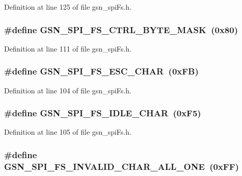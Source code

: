 Definition at line 125 of file gsn\_\-spiFs.h.

\hypertarget{a00589_a3204c4dc871b1ad1a9ef9824ffc6363a}{
\subsubsection[{GSN\_\-SPI\_\-FS\_\-CTRL\_\-BYTE\_\-MASK}]{\setlength{\rightskip}{0pt plus 5cm}\#define GSN\_\-SPI\_\-FS\_\-CTRL\_\-BYTE\_\-MASK~(0x80)}}
\label{a00589_a3204c4dc871b1ad1a9ef9824ffc6363a}


Definition at line 111 of file gsn\_\-spiFs.h.

\hypertarget{a00589_a7e094b6ce520816d1515bb857773d6d8}{
\subsubsection[{GSN\_\-SPI\_\-FS\_\-ESC\_\-CHAR}]{\setlength{\rightskip}{0pt plus 5cm}\#define GSN\_\-SPI\_\-FS\_\-ESC\_\-CHAR~(0xFB)}}
\label{a00589_a7e094b6ce520816d1515bb857773d6d8}


Definition at line 104 of file gsn\_\-spiFs.h.

\hypertarget{a00589_acd339376b057e3f2e518c3985f6b4556}{
\subsubsection[{GSN\_\-SPI\_\-FS\_\-IDLE\_\-CHAR}]{\setlength{\rightskip}{0pt plus 5cm}\#define GSN\_\-SPI\_\-FS\_\-IDLE\_\-CHAR~(0xF5)}}
\label{a00589_acd339376b057e3f2e518c3985f6b4556}


Definition at line 105 of file gsn\_\-spiFs.h.

\hypertarget{a00589_a6f299c98b20c562e7e5c9f96ec285cff}{
\subsubsection[{GSN\_\-SPI\_\-FS\_\-INVALID\_\-CHAR\_\-ALL\_\-ONE}]{\setlength{\rightskip}{0pt plus 5cm}\#define GSN\_\-SPI\_\-FS\_\-INVALID\_\-CHAR\_\-ALL\_\-ONE~(0xFF)}}
\label{a00589_a6f299c98b20c562e7e5c9f96ec285cff}


